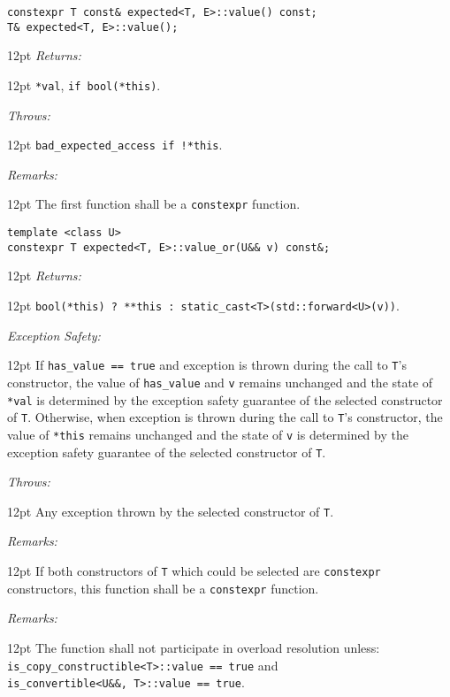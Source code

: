 \documentclass[a4paper,10pt]{article}
\newcommand{\cpp}[1]{\lstinline{#1}}
\newcommand{\wordingItem}[1]{\noindent\textit{#1:}}
\newenvironment{wordingTextItem}[1]{\wordingItem{#1}\vspace{7pt}\noindent\begin{adjustwidth}{12pt}{}}{\vspace{7pt}\end{adjustwidth}}
\newenvironment{wordingPara}{\begin{adjustwidth}{12pt}{}}{\end{adjustwidth}}
\begin{document}
\begin{lstlisting}[xleftmargin=0pt]
constexpr T const& expected<T, E>::value() const;
T& expected<T, E>::value(); 
\end{lstlisting}
\begin{wordingPara}
\begin{wordingTextItem}{Returns}
\cpp{*val}, \cpp{if bool(*this)}.
\end{wordingTextItem}
\begin{wordingTextItem}{Throws}
\cpp{bad_expected_access if !*this}.
\end{wordingTextItem}
\begin{wordingTextItem}{Remarks}
The first function shall be a \cpp{constexpr} function.
\end{wordingTextItem}
\end{wordingPara}

\begin{lstlisting}[xleftmargin=0pt]
template <class U>
constexpr T expected<T, E>::value_or(U&& v) const&; 
\end{lstlisting}
\begin{wordingPara}
\begin{wordingTextItem}{Returns}
\cpp{bool(*this) ? **this : static_cast<T>(std::forward<U>(v))}.
\end{wordingTextItem}
\begin{wordingTextItem}{Exception Safety}
If \cpp{has_value == true} and exception is thrown during the call to \cpp{T}'s constructor, the value of \cpp{has_value} and \cpp{v} remains unchanged and the state of \cpp{*val} is determined by the exception safety guarantee of the selected constructor of \cpp{T}. Otherwise, when exception is thrown during the call to \cpp{T}'s constructor, the value of \cpp{*this} remains unchanged and the state of \cpp{v} is determined by the exception safety guarantee of the selected constructor of \cpp{T}.
\end{wordingTextItem}
\begin{wordingTextItem}{Throws}
Any exception thrown by the selected constructor of \cpp{T}.
\end{wordingTextItem}
\begin{wordingTextItem}{Remarks}
If both constructors of \cpp{T} which could be selected are \cpp{constexpr} constructors, this function shall be a \cpp{constexpr} function.
\end{wordingTextItem}
\begin{wordingTextItem}{Remarks}
The function shall not participate in overload resolution unless: \\
\cpp{is_copy_constructible<T>::value == true} and \\
\cpp{is_convertible<U&&, T>::value == true}.
\end{wordingTextItem}
\end{wordingPara}
\end{document}
